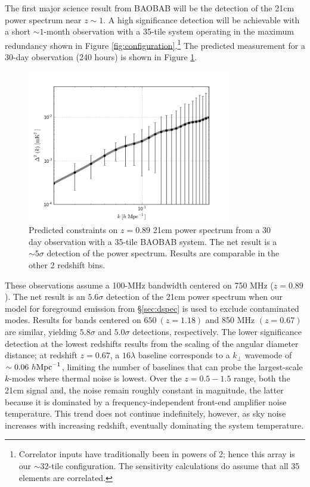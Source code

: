 \documentclass[10pt,iop]{emulateapj}
\begin{document}
The first major science result from BAOBAB will be the detection of the 21cm power spectrum near 
$z\sim1$.  A high significance detection will be achievable with a short $\sim1$-month observation
with a 35-tile system operating in the 
maximum redundancy shown in Figure \ref{fig:configuration}.\footnote{Correlator inputs have 
traditionally been in powers of 2; hence this array is our $\sim 32$-tile configuration. The sensitivity calculations do assume that all 35 elements are correlated.}  
The predicted measurement for a 30-day observation 
(240 hours) is shown in Figure \ref{fig:baobab32_sense}.  
\begin{figure}\centering
\includegraphics[width=3.5in]{baobab32_sense-2.png}
\caption{Predicted constraints on $z = 0.89$ 21cm power spectrum from a 30 day observation with
a 35-tile BAOBAB system.  The net result is a $\sim5\sigma$ detection of the
power spectrum.  Results are comparable in the other 2 redshift bins. 
} \label{fig:baobab32_sense}
\end{figure}
These observations assume a 100-MHz
bandwidth centered on 750 MHz ($z = 0.89$).  The net result is an $5.6\sigma$ detection of
the 21cm power spectrum when our model for foreground emission from \S\ref{sec:dspec}
is used to exclude contaminated modes.  
Results for bands centered on $650~(z = 1.18)$ and 850 MHz $(z = 0.67)$
are similar, yielding $5.8\sigma$ and $5.0\sigma$ detections, respectively.
The lower
significance detection at the lowest redshifts results from the scaling of the angular diameter
distance; at redshift $z = 0.67$, a $16\lambda$ baseline corresponds to a $k_{\perp}$ wavemode
of $\sim0.06~h{\rm Mpc}^{-1}$, limiting the number of baselines that can probe
the largest-scale $k$-modes where thermal noise is lowest.  
Over the $z = 0.5-1.5$ range, both the 21cm signal and,
the noise remain roughly constant in magnitude, the latter because it is dominated 
by a frequency-independent
front-end amplifier noise temperature.  This trend does not continue indefinitely, however,
as sky noise increases with increasing redshift, eventually dominating the system temperature.
  
\end{document}
